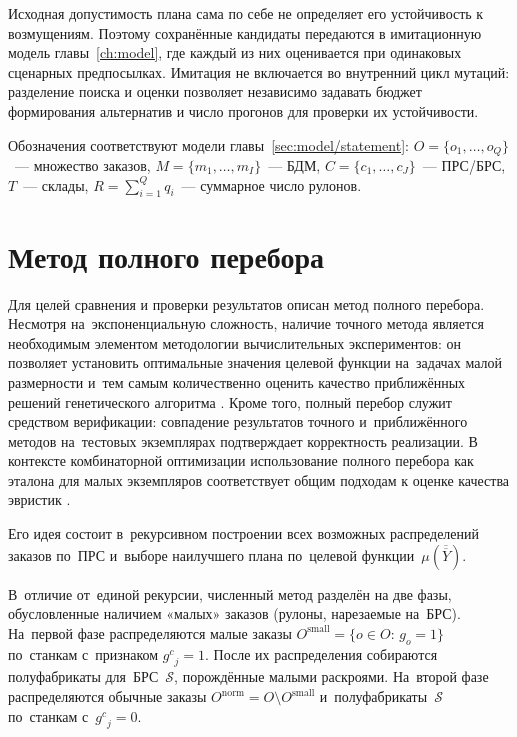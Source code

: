 Исходная допустимость плана сама по себе не определяет его устойчивость к возмущениям. Поэтому сохранённые кандидаты передаются в имитационную модель главы~\ref{ch:model}, где каждый из них оценивается при одинаковых сценарных предпосылках. Имитация не включается во внутренний цикл мутаций: разделение поиска и оценки позволяет независимо задавать бюджет формирования альтернатив и число прогонов для проверки их устойчивости.

Обозначения соответствуют модели главы~\ref{sec:model/statement}: $O=\{o_1,\ldots,o_Q\}$~--- множество заказов, $M=\{m_1,\ldots,m_I\}$~--- БДМ, $C=\{c_1,\ldots,c_J\}$~--- ПРС/БРС, $T$~--- склады, $R=\sum_{i=1}^{Q}q_i$~--- суммарное число рулонов.

\section{Метод полного перебора}\label{sec:alg/full_enum}

Для целей сравнения и проверки результатов описан метод полного перебора.
Несмотря на~экспоненциальную сложность, наличие точного метода является необходимым элементом методологии вычислительных экспериментов: он позволяет установить оптимальные значения целевой функции на~задачах малой размерности и~тем самым количественно оценить качество приближённых решений генетического алгоритма \cite{delorme2016bin}.
Кроме того, полный перебор служит средством верификации: совпадение результатов точного и~приближённого методов на~тестовых экземплярах подтверждает корректность реализации.
В контексте комбинаторной оптимизации использование полного перебора как эталона для малых экземпляров соответствует общим подходам к оценке качества эвристик \cite{papadimitriou1998_combinatorial_opt, scheithauer2017_cutpack_optimization}.

Его идея состоит в~рекурсивном построении всех возможных распределений заказов по~ПРС и~выборе наилучшего плана по~целевой функции~$\mu(\overline{\overline{Y}})$.

В~отличие от~единой рекурсии, численный метод разделён на две фазы, обусловленные наличием «малых» заказов (рулоны, нарезаемые на~БРС).
На~первой фазе распределяются малые заказы $O^{\mathrm{small}}=\{o\in O:\,g_o=1\}$ по~станкам с~признаком ${g^c}_j=1$.
После их распределения собираются полуфабрикаты для~БРС~$\mathcal{S}$, порождённые малыми раскроями.
На~второй фазе распределяются обычные заказы $O^{\mathrm{norm}}=O\setminus O^{\mathrm{small}}$ и~полуфабрикаты~$\mathcal{S}$ по~станкам с~${g^c}_j=0$.

